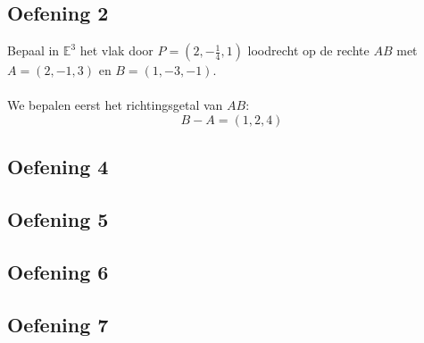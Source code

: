 \documentclass[main.tex]{subfiles}
\begin{document}
\subsection*{Oefening 2}
Bepaal in $\mathbb{E}^{3}$ het vlak door $P=\left(2,-\frac{1}{4},1\right)$ loodrecht op de rechte $AB$ met $A=(2,-1,3)$ en $B=(1,-3,-1)$.\\\\
We bepalen eerst het richtingsgetal van $AB$:
\[ B-A=(1,2,4) \]
\subsection*{Oefening 4}
\subsection*{Oefening 5}
\subsection*{Oefening 6}
\subsection*{Oefening 7}
\end{document}
